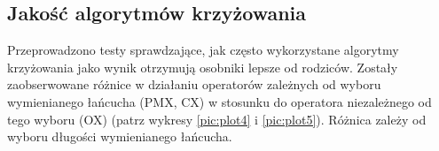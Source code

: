 \documentclass[12pt]{article}
\begin{document}
\subsection{Jakość algorytmów krzyżowania}

Przeprowadzono testy sprawdzające, jak często wykorzystane algorytmy
krzyżowania jako wynik otrzymują osobniki lepsze od rodziców. Zostały
zaobserwowane różnice w działaniu operatorów zależnych od wyboru
wymienianego łańcucha (PMX, CX) w stosunku do operatora niezależnego
od tego wyboru (OX) (patrz wykresy \ref{pic:plot4} i \ref{pic:plot5}).
Różnica zależy od wyboru długości wymienianego łańcucha.
\end{document}
